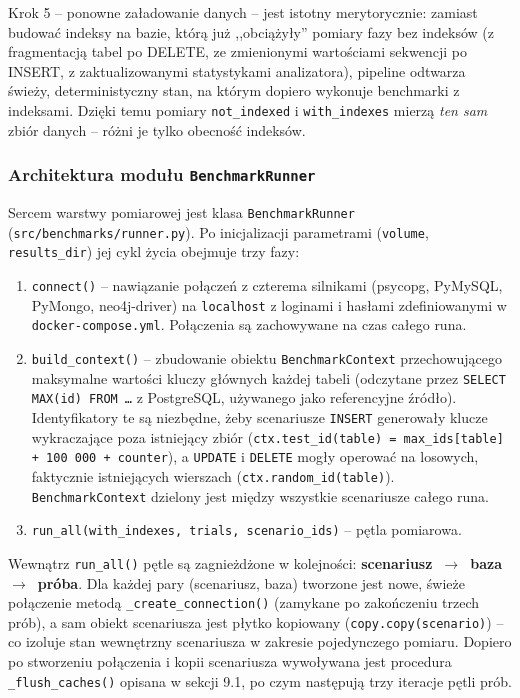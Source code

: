 Krok 5 -- ponowne załadowanie danych -- jest istotny merytorycznie:
zamiast budować indeksy na bazie, którą już ,,obciążyły'' pomiary
fazy bez indeksów (z fragmentacją tabel po DELETE, ze zmienionymi
wartościami sekwencji po INSERT, z zaktualizowanymi statystykami
analizatora), pipeline odtwarza świeży, deterministyczny stan, na
którym dopiero wykonuje benchmarki z indeksami. Dzięki temu pomiary
\texttt{not\_indexed} i \texttt{with\_indexes} mierzą \emph{ten sam}
zbiór danych -- różni je tylko obecność indeksów.

\subsubsection*{Architektura modułu \texttt{BenchmarkRunner}}

Sercem warstwy pomiarowej jest klasa \texttt{BenchmarkRunner}
(\texttt{src/benchmarks/runner.py}). Po inicjalizacji parametrami
(\texttt{volume}, \texttt{results\_dir}) jej cykl życia obejmuje
trzy fazy:

\begin{enumerate}
    \item \texttt{connect()} -- nawiązanie połączeń z czterema
    silnikami (psycopg, PyMySQL, PyMongo, neo4j-driver) na
    \texttt{localhost} z loginami i hasłami zdefiniowanymi w
    \texttt{docker-compose.yml}. Połączenia są zachowywane na czas
    całego runa.
    \item \texttt{build\_context()} -- zbudowanie obiektu
    \texttt{BenchmarkContext} przechowującego maksymalne wartości
    kluczy głównych każdej tabeli (odczytane przez
    \texttt{SELECT MAX(id) FROM \dots} z PostgreSQL, używanego jako
    referencyjne źródło). Identyfikatory te są niezbędne, żeby
    scenariusze \texttt{INSERT} generowały klucze wykraczające
    poza istniejący zbiór (\texttt{ctx.test\_id(table) =
    max\_ids[table] + 100\,000 + counter}), a \texttt{UPDATE}
    i \texttt{DELETE} mogły operować na losowych, faktycznie
    istniejących wierszach (\texttt{ctx.random\_id(table)}).
    \texttt{BenchmarkContext} dzielony jest między wszystkie
    scenariusze całego runa.
    \item \texttt{run\_all(with\_indexes, trials, scenario\_ids)}
    -- pętla pomiarowa.
\end{enumerate}

Wewnątrz \texttt{run\_all()} pętle są zagnieżdżone w kolejności:
\textbf{scenariusz~$\rightarrow$~baza~$\rightarrow$~próba}.
Dla każdej pary (scenariusz, baza) tworzone jest nowe, świeże
połączenie metodą \texttt{\_create\_connection()} (zamykane po
zakończeniu trzech prób), a sam obiekt scenariusza jest płytko
kopiowany (\texttt{copy.copy(scenario)}) -- co izoluje stan
wewnętrzny scenariusza w zakresie pojedynczego pomiaru.
Dopiero po stworzeniu połączenia i kopii scenariusza wywoływana
jest procedura \texttt{\_flush\_caches()} opisana w sekcji 9.1,
po czym następują trzy iteracje pętli prób.


